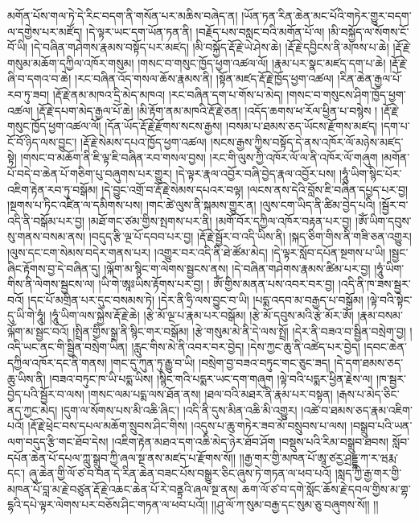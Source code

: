 མགོན་པོས་གལ་ཏེ་དེ་རིང་བདག་ནི་གསོན་པར་མཆིས་བཞེད་ན། །ཡོན་ཏན་རིན་ཆེན་མང་པོའི་གཏེར་གྱུར་བདག་ལ་དགྱེས་པར་མཛོད། །དེ་ལྟར་ཡང་དག་ཡོན་ཏན་ནི། །བརྗོད་པས་བསླང་བའི་མགོན་པོ་ལ། །མི་བསྐྱོད་ལ་སོགས་ངོ་བོ་ཡི། །དེ་བཞིན་གཤེགས་རྣམས་བསྟོད་པར་མཛད། །མི་བསྐྱོད་རྡོ་རྗེ་ཡེ་ཤེས་ཆེ། །རྡོ་རྗེ་དབྱིངས་ནི་མཁས་པ་ཆེ། །རྡོ་རྗེ་གསུམ་མཆོག་དཀྱིལ་འཁོར་གསུམ། །གསང་བ་གསུང་ཁྱོད་ཕྱག་འཚལ་ལོ། །རྣམ་པར་སྣང་མཛད་དག་པ་ཆེ། །རྡོ་རྗེ་ཞི་བ་དགའ་བ་ཆེ། །རང་བཞིན་འོད་གསལ་ཆོས་རྣམས་ནི། །སྟོན་མཛད་རྡོ་རྗེ་ཁྱོད་ཕྱག་འཚལ། །རིན་ཆེན་རྒྱལ་པོ་རབ་ཏུ་ཟབ། །རྡོ་རྗེ་ནམ་མཁའ་དྲི་མེད་མཁའ། །རང་བཞིན་དག་པ་གོས་པ་མེད། །གསང་བ་གསུངས་ཤིག་ཁྱོད་ཕྱག་འཚལ། །རྡོ་རྗེ་དཔག་མེད་རྒྱལ་པོ་ཆེ། །མི་རྟོག་ནམ་མཁའི་རྡོ་རྗེ་ཅན། །འདོད་ཆགས་ཕ་རོལ་ཕྱིན་པ་བསྙེས ། །རྡོ་རྗེ་གསུང་ཁྱོད་ཕྱག་འཚལ་ལོ། །དོན་ཡོད་རྡོ་རྗེ་རྫོགས་སངས་རྒྱས། །བསམ་པ་ཐམས་ཅད་ཡོངས་རྫོགས་མཛད། །དག་པ་ངོ་བོ་ཉིད་ལས་བྱུང་། །རྡོ་རྗེ་སེམས་དཔའ་ཁྱོད་ཕྱག་འཚལ། །སངས་རྒྱས་ཀྱིས་བསྟོད་དེ་ནས་འཁོར་ལོ་མཉེས་མཛད་སྟེ། །གསང་བ་མཆོག་ནི་ཇི་ལྟ་ཇི་བཞིན་རབ་གསལ་བྱས། །རང་གི་ལུས་ཀྱི་འཁོར་ལོ་ལ་ནི་འཁོར་ལོ་གཞུག །མགོན་པོ་བདེ་བ་ཆེན་པོ་གཅིག་པུ་བཞུགས་པར་གྱུར། །དེ་ལྟར་རྣལ་འབྱོར་བཞི་བྱེད་རྣལ་འབྱོར་པས། །ཧཱུཾ་ཡིག་སྙིང་པོར་འཇིག་རྟེན་རབ་ཏུ་བསྒོམ། །དེ་བྱུང་འགྲོ་བ་རྡོ་རྗེ་སེམས་དཔའར་བལྟ། །ལངས་ནས་དེའི་བློས་ཇི་བཞིན་དཔྱད་པར་བྱ། །སྔགས་པ་ཏིང་འཛིན་ལ་དམིགས་པས། །གང་ཚེ་ལུས་ནི་སྐམས་གྱུར་ན། །ལུས་ངག་ཡིད་ནི་ཚིམ་བྱེད་པའི། །སྦྱོར་བ་འདི་ནི་བསྒོམ་པར་བྱ། །མཐོ་གང་ཙམ་གྱིས་སྤགས་པར་ནི། །མགོ་བོར་དཀྱིལ་འཁོར་བརྟན་པར་བྱ། །ཨོཾ་ཡིག་དབུས་སུ་གནས་བསམ་ནས། །བདུད་རྩི་ལྔ་པོ་དབབ་པར་བྱ། །རྡོ་རྗེ་སྦྱོར་བ་འདི་ཡིས་ནི། །སྐད་ཅིག་གིས་ནི་གཟི་ཅན་འགྱུར། །ལུས་དང་ངག་སེམས་བདེར་གནས་པར། །འགྱུར་བར་འདི་ནི་ཐེ་ཚོམ་མེད། །དེ་ལྟར་སློབ་དཔོན་སྔགས་པ་ཡི། །སྦྱང་ཞིང་རྟོགས་བྱ་དེ་བཞིན་དུ། །ལྐོག་མ་སྙིང་ག་ལེགས་སྦྱངས་ནས། །དེ་བཞིན་གཤེགས་རྣམས་ཚིམ་པར་བྱ། །ཧཱུཾ་ཡིག་གིས་ནི་ལེགས་སྦྱངས་ལ། །ཡི་གེ་ཨཱཿཡིས་རྟོགས་པར་བྱ། །
ཨོཾ་གྱིས་མནན་པས་འབར་བར་བྱ། །འདི་ནི་ཁ་ཟས་སྦྱར་བའོ། །དང་པོ་མགྲིན་པར་དུང་བསམས་ཏེ། །དེར་ནི་ཧྲི་ལས་བྱུང་བ་ཡི། །པདྨ་འདབ་མ་བརྒྱད་པ་བསྒོམ། །ལྟེ་བའི་སྟེང་དུ་ཡི་གེ་ཧཱུཾ། །ཧཱུཾ་ཡིག་ལས་སྐྱེས་རྡོ་རྗེ་ཆེ། །རྩེ་མོ་ལྔ་པ་རྣམ་པར་བསྒོམ། །རྩེ་མོ་དབུས་མའི་རྩེ་མོར་ཨོཾ། །རྣམ་བསམ་ལྐོག་མ་སྦྱང་བའོ། །སྤྲིན་གྱིས་སྒྲ་ནི་སྙིང་གར་བསྒོམ། །རྩེ་གསུམ་མེ་ནི་དེ་ལས་སྤྲོ། །དེར་ནི་བཟའ་བ་སྦྱིན་བསྲེག་བྱ། །འདི་ཡང་ནང་གི་སྦྱིན་བསྲེག་ཡིན། །རླུང་གིས་མེ་ནི་འབར་བར་བྱེད། །དེས་ཀྱང་ཆུ་ནི་འཚེད་པར་བྱེད། །དབང་ཆེན་དཀྱིལ་འཁོར་དང་ནི་གནས། །གང་དུ་ཀུན་ཏུ་རྒྱུ་བ་ཡི། །བསྲེག་བྱ་བཟའ་བཏུང་གང་ཅུང་ཟད། །དེ་དག་ཐམས་ཅད་ཆུ་ཡིས་ནི། །བཟའ་བཏུང་ཁ་ཡི་པདྨ་ཡིས། །སྙིང་གའི་པདྨར་ཡང་དག་གཞུག །ལྟེ་བའི་པདྨར་ཕྱིན་རྗེས་ལ། །ཁ་སྦྱར་བྱེད་པའི་སྦྱོར་བ་ལས། །གསང་ལམ་པདྨ་ལས་ཐོན་ནས། །ཐལ་བའི་མཐར་ནི་རྣམ་པར་བསྟན། །རྒས་པ་མེད་ཅིང་ནད་ཀྱང་མེད། །དུག་ལ་སོགས་པས་མི་འཆི་ཞིང་། །འདི་ནི་དུས་མིན་འཆི་མི་འགྱུར། །འཚེ་བ་ཐམས་ཅད་རྣམ་འཇིག་པའོ། །རྡོ་རྗེ་ཕྲེང་བས་དཔལ་མཆོག་སྲུབས་ཤིང་གིས། །འདུས་པ་ཆུ་གཏེར་ཟབ་མོ་བསྲུབས་པ་ལས། །བསྒྲུབ་པའི་ཡན་ལག་བདུད་རྩི་གང་ཐོབ་དེས། །འཇིག་རྟེན་མཐའ་དག་འཆི་མེད་ཉེར་ཐོབ་ཤོག །བསྡུས་པའི་རིམ་བསྒྲུབ་ཐབས། སློབ་དཔོན་ཆེན་པོ་དཔལ་ཀླུ་སྒྲུབ་ཀྱི་ཞལ་སྔ་ནས་མཛད་པ་རྫོགས་སོ།། །།རྒྱ་གར་གྱི་མཁན་པོ་ཨཱ་ཙརྱ་ཤྲདྡྷ་ཀ་ར་ཝརྨ་དང་། ཞུ་ཆེན་གྱི་ལོ་ཙ་བ་བན་དེ་རིན་ཆེན་བཟང་པོས་བསྒྱུར་ཅིང་ཞུས་ཏེ་གཏན་ལ་ཕབ་པའོ། །སླད་ཀྱི་རྒྱ་གར་གྱི་མཁན་པོ་བླ་མ་རྗེ་བཙུན་རྡོ་རྗེ་འཆང་ཆེན་པོ་རེ་བནྟྲའི་ཞལ་སྔ་ནས། ཆག་ལོ་ཙ་བ་དགེ་སློང་ཆོས་རྗེ་དབལ་གྱིས་མ་གྷ་དྷའི་དཔེ་ལྟར་ལེགས་པར་བཅོས་ཤིང་གཏན་ལ་ཕབ་པའོ།། །།ཤུ་ལོ་ཀ་སུམ་བརྒྱ་དང་སུམ་ཅུ་བཞུགས་སོ།། །།